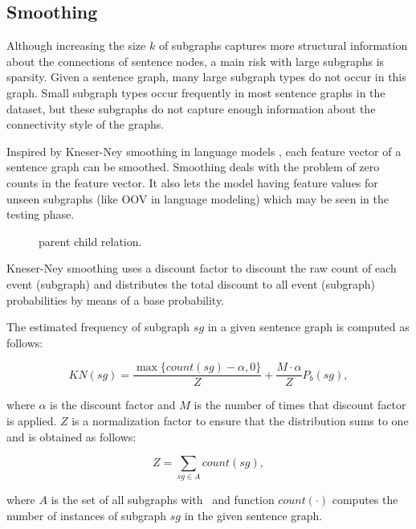\subsection{Smoothing} 
% 
Although increasing the size $k$ of subgraphs captures more
structural information about the connections of sentence nodes, a
main risk with large subgraphs is sparsity. Given a sentence graph,
many large subgraph types do not occur in this graph.  Small subgraph
types occur frequently in most sentence graphs in the dataset, but
these subgraphs do not capture enough information about the
connectivity style of the graphs.

Inspired by Kneser-Ney smoothing in language models \cite{heafield13},
each feature vector of a sentence graph can be smoothed. Smoothing
deals with the problem of zero counts in the feature vector.  It also
lets the model having feature values for unseen subgraphs (like OOV in
language modeling) which may be seen in the testing phase.

\begin{figure*}[!t]
\centering
\small
\caption{parent child relation.} 
\label{f:parent_child_rel}
\end{figure*}

Kneser-Ney smoothing uses a discount factor to discount the raw count
of each event (subgraph) and distributes the total discount to all
event (subgraph) probabilities by means of a base probability.

The estimated frequency of subgraph $sg$ in a given sentence graph
is computed as follows:

\begin{equation*}
KN(sg) = \frac{\max \lbrace	 count(sg)-\alpha, 0 \rbrace }{Z} + \frac{M \cdot \alpha}{Z}P_b(sg),
\end{equation*}

\noindent
where $\alpha$ is the discount factor and $M$ is the number of times
that discount factor is applied. $Z$ is a normalization factor
to ensure that the distribution sums to one and is obtained as follows:

\begin{equation*}
Z = \sum_{sg \in A} count(sg),
\end{equation*}

\noindent
where $A$ is the set of all subgraphs with \knodes\ and function
$count(\cdot)$ computes the number of instances of subgraph $sg$ in
the given sentence graph.


